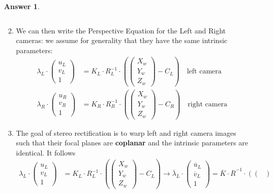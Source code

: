 \documentclass[a4paper,12 pt]{article}
\theoremstyle{definition}
\theoremstyle{remark}
\theoremstyle{definition}
\theoremstyle{definition}
\theoremstyle{definition}
\theoremstyle{definition}
\theoremstyle{remark}
\theoremstyle{remark}
\theoremstyle{definition}
\theoremstyle{definition}
\newtheorem*{answer}{Answer}
\begin{document}
\begin{enumerate}
\begin{answer}
\begin{enumerate}
\begin{equation}
\end{equation}
\item We can then write the Perspective Equation for the Left and Right cameras: we assume for generality that they have the same intrinsic parameters:
\begin{equation}
\begin{split}
\lambda_L\cdot \begin{pmatrix}
 u_L\\
 v_L\\
 1
 \end{pmatrix}&= K_L\cdot R_L^{-1}\cdot \left(\begin{pmatrix}
 X_w\\
 Y_w\\
 Z_w
 \end{pmatrix}-C_L\right) \quad \text{left camera}\\
 \lambda_R\cdot \begin{pmatrix}
 u_R\\
 v_R\\
 1
 \end{pmatrix}&= K_R\cdot R_R^{-1}\cdot \left(\begin{pmatrix}
 X_w\\
 Y_w\\
 Z_w
 \end{pmatrix}-C_R\right) \quad \text{right camera}
\end{split}
\end{equation}
\item The goal of stereo rectification is to warp left and right camera images such that their focal planes are \textbf{coplanar} and the intrinsic parameters are identical. It follows 
\begin{equation}
\begin{split}
\lambda_L\cdot \begin{pmatrix}
 u_L\\
 v_L\\
 1
 \end{pmatrix}&= K_L\cdot R_L^{-1}\cdot \left(\begin{pmatrix}
 X_w\\
 Y_w\\
 Z_w
 \end{pmatrix}-C_L\right) \rightarrow \overline{\lambda}_L\cdot \begin{pmatrix}
 \overline{u}_L\\
 \overline{v}_L\\
 1
 \end{pmatrix}= \overline{K}\cdot \overline{R}^{-1}\cdot \left(\begin{pmatrix}

\end{pmatrix}
\end{split}
\end{equation}
\end{enumerate}
\end{answer}
\end{enumerate}
\end{document}
